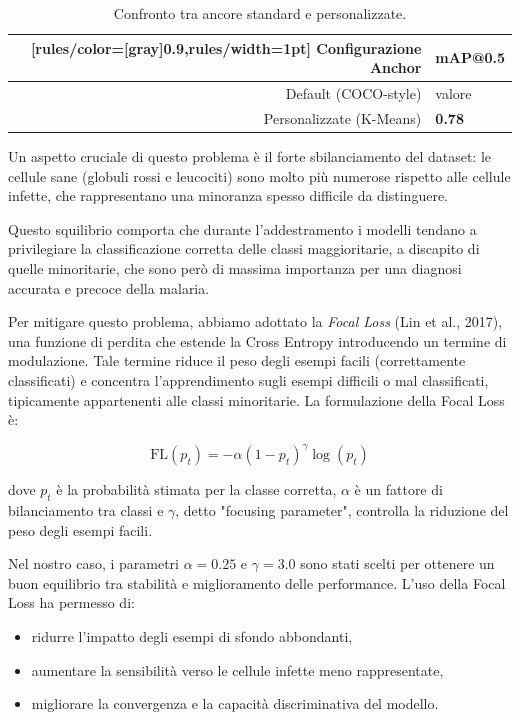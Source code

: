\documentclass[minted, draw]{../tex/hebdomon}
\begin{document}
\begin{table}[!ht]
	\centering
	\begin{NiceTabular}{rX}[rules/color=[gray]{0.9},rules/width=1pt]
		\CodeBefore
		\Body
		\toprule
		\textbf{Configurazione Anchor} & \textbf{mAP@0.5} \\
		\midrule
		Default (COCO-style)         & valore \\
		Personalizzate (K-Means)     & \textbf{0.78} \\
		\bottomrule
	\end{NiceTabular}
	\caption{Confronto tra ancore standard e personalizzate.}
	\label{tab:custom_anchors}
\end{table}


Un aspetto cruciale di questo problema è il forte sbilanciamento del dataset: le cellule sane (globuli rossi e leucociti) sono molto più numerose rispetto alle cellule infette, che rappresentano una minoranza spesso difficile da distinguere.

Questo squilibrio comporta che durante l’addestramento i modelli tendano a privilegiare la classificazione corretta delle classi maggioritarie, a discapito di quelle minoritarie, che sono però di massima importanza per una diagnosi accurata e precoce della malaria.

Per mitigare questo problema, abbiamo adottato la \textit{Focal Loss} (Lin et al., 2017), una funzione di perdita che estende la Cross Entropy introducendo un termine di modulazione. Tale termine riduce il peso degli esempi facili (correttamente classificati) e concentra l’apprendimento sugli esempi difficili o mal classificati, tipicamente appartenenti alle classi minoritarie. La formulazione della Focal Loss è:

\[
\text{FL}(p_t) = -\alpha (1 - p_t)^\gamma \log(p_t)
\]

dove \( p_t \) è la probabilità stimata per la classe corretta, \(\alpha\) è un fattore di bilanciamento tra classi e \(\gamma\), detto "focusing parameter", controlla la riduzione del peso degli esempi facili.

Nel nostro caso, i parametri \(\alpha = 0.25\) e \(\gamma = 3.0\) sono stati scelti per ottenere un buon equilibrio tra stabilità e miglioramento delle performance. L’uso della Focal Loss ha permesso di:

\begin{itemize}
    \item ridurre l’impatto degli esempi di sfondo abbondanti,
    \item aumentare la sensibilità verso le cellule infette meno rappresentate,
    \item migliorare la convergenza e la capacità discriminativa del modello.
\end{itemize}
\end{document}
